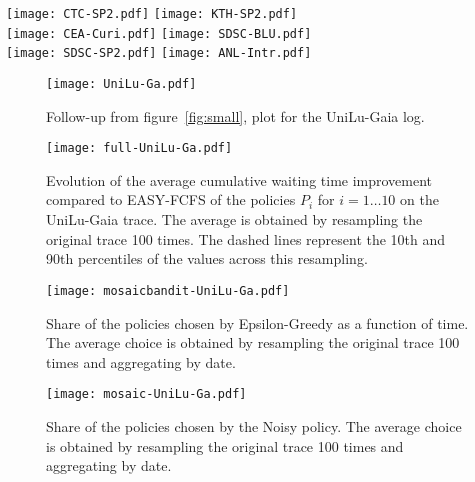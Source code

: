 \documentclass[sigconf]{acmart}
\begin{document}
\begin{figure*}[h]
  \centering
  \texttt{[image: CTC-SP2.pdf]}
  \texttt{[image: KTH-SP2.pdf]}\\
  \texttt{[image: CEA-Curi.pdf]}
  \texttt{[image: SDSC-BLU.pdf]}\\
  \texttt{[image: SDSC-SP2.pdf]}
  \texttt{[image: ANL-Intr.pdf]}

  \caption{Evolution of the average cumulative waiting time improvement
    compared to EASY-FCFS of the FullFeedback, NoisyFeedback and EpsilonGreedy
    policies. The average is obtained by resampling the original trace 100
    times. The dashed lines represent the 10th and 90th percentiles of the
  values across this resampling. Each figure is a different trace, and this
figure is followed-up in figure~\ref{fig:follow} for the UniLu-Gaia log.}

  \label{fig:small}
\end{figure*}

\begin{figure}[ht]
  \centering
  \texttt{[image: UniLu-Ga.pdf]}

  \caption{Follow-up from figure~\ref{fig:small}, plot for the UniLu-Gaia log.}

  \label{fig:follow}
\end{figure}

\begin{figure}[ht]
  \centering
  \texttt{[image: full-UniLu-Ga.pdf]}

  \caption{Evolution of the average cumulative waiting time improvement
    compared to EASY-FCFS of the policies $P_i$ for $i = 1 \ldots 10$ on the
    UniLu-Gaia trace. The
    average is obtained by resampling the original trace 100 times. The dashed
    lines represent the 10th and 90th percentiles of the values across this
  resampling.}

  \label{fig:all}
\end{figure}

\begin{figure}[H]
  \centering
  \texttt{[image: mosaicbandit-UniLu-Ga.pdf]}
  \caption{Share of the policies chosen by Epsilon-Greedy as a function of time.
  The average choice is obtained by resampling the original trace 100 times and
  aggregating by date.}
  \label{fig:mosb}
\end{figure}

\begin{figure}[ht]
  \centering
  \texttt{[image: mosaic-UniLu-Ga.pdf]}
  \caption{Share of the policies chosen by the Noisy policy. The average
  choice is obtained by resampling the original trace 100 times and
  aggregating by date.}
  \label{fig:mosn}
\end{figure}
\end{document}
